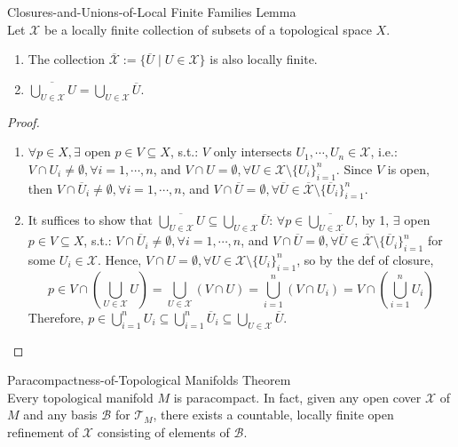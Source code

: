 \begin{lemma}{Closures-and-Unions-of-Local Finite Families Lemma}\\
Let $\mathcal{X}$ be a locally finite collection of subsets of a topological space $X$.
\begin{enumerate}
    \item The collection $\overline{\mathcal{X}}:= \{\overline{U} \mid U\in \mathcal{X} \}$ is also locally finite.
    \item $\overline{\bigcup_{U\in \mathcal{X}}U}= \bigcup_{U\in \mathcal{X}} \overline{U}$.
\end{enumerate}
\end{lemma}

\begin{proof}
    \begin{enumerate}
        \item $\forall p\in X, \exists$ open $p\in V\subseteq X$, s.t.: $V$ only intersects $U_1,\cdots, U_n \in \mathcal{X}$, i.e.: $V \cap U_i \neq \emptyset, \forall i=1, \cdots, n$, and $V\cap U=\emptyset ,\forall U\in \mathcal{X} \setminus \{U_i\}_{i=1}^n$. Since $V$ is open, then $V \cap \overline{U}_i\neq \emptyset, \forall i=1,\cdots, n$, and $V\cap \overline{U}= \emptyset ,\forall \overline{U} \in \overline{\mathcal{X}} \setminus \{\overline{U}_i\}_{i=1}^n$.

        \item It suffices to show that $\overline{\bigcup_{U\in \mathcal{X}}U} \subseteq \bigcup_{U\in \mathcal{X}} \overline{U}$: $\forall p\in \overline{\bigcup_{U\in \mathcal{X}}U}$, by 1, $\exists$ open $p\in V\subseteq X$, s.t.: $V\cap \overline{U}_i\neq \emptyset ,\forall i=1,\cdots, n$, and $V\cap \overline{U}=\emptyset ,\forall \overline{U}\in \overline{\mathcal{X}} \setminus \{\overline{U}_i\}_{i=1}^n$ for some $U_i\in \mathcal{X}$. Hence, $V\cap U=\emptyset, \forall U\in \mathcal{X} \setminus\{U_i\}_{i=1}^n$, so by the def of closure,
        \[
        p\in V\cap (\bigcup_{U\in \mathcal{X}}U) =\bigcup_{U\in \mathcal{X}}(V\cap U) = \bigcup_{i=1}^n (V\cap U_i)= V\cap (\bigcup_{i=1}^n U_i)
        \]
        Therefore, $p\in \bigcup_{i=1}^n U_i \subseteq \bigcup_{i=1}^n \overline{U}_i \subseteq \bigcup_{U\in \mathcal{X}} \overline{U}$.
    \end{enumerate}
\end{proof}

\begin{theorem}{Paracompactness-of-Topological Manifolds Theorem}\\
Every topological manifold $M$ is paracompact. In fact, given any open cover $\mathcal{X}$ of $M$ and any basis $\mathcal{B}$ for $\mathcal{T}_M$, there exists a countable, locally finite open refinement of $\mathcal{X}$ consisting of elements of $\mathcal{B}$.
\end{theorem}

